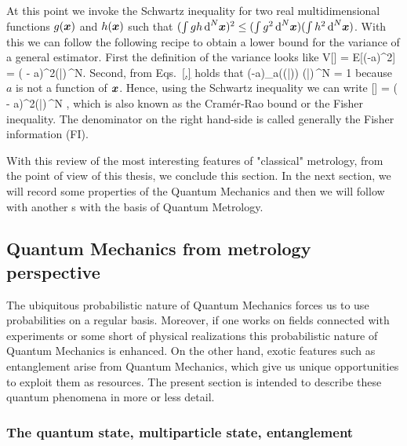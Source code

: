 At this point we invoke the Schwartz inequality for two real multidimensional functions $g(\boldsymbol{x})$ and $h(\boldsymbol{x})$ such that $(\int g h \,\text{d}^N\boldsymbol{x})^2\leq (\int g^2 \,\text{d}^N\boldsymbol{x}) (\int h^2 \,\text{d}^N\boldsymbol{x})$.
With this we can follow the following recipe to obtain a lower bound for the variance of a general estimator.
First the definition of the variance looks like
\be
  V[] = E[(-a)^2] = \int ( - a)^2\prob(|)\,^N.
\ee
Second, from Eqs.~\eqref{,} holds that
\be
  \int (-a)\partial_a\big(\ln  \prob(|)\big) \prob(|)\,^N = 1
\ee
because $a$ is not a function of $\boldsymbol{x}$.
Hence, using the Schwartz inequality we can write
\be
  [] = \int ( - a)^2\prob(|)\,^N \geq {},
\ee
which is also known as the Cram\'er-Rao bound or the Fisher inequality.
The denominator on the right hand-side is called generally the Fisher information (FI).

With this review of the most interesting features of "classical" metrology, from the point of view of this thesis, we conclude this section.
In the next section, we will record some properties of the Quantum Mechanics and then we will follow with another s with the basis of Quantum Metrology.

\subsection{Quantum Mechanics from metrology perspective}

The ubiquitous probabilistic nature of Quantum Mechanics forces us to use probabilities on a regular basis.
Moreover, if one works on fields connected with experiments or some short of physical realizations this probabilistic nature of Quantum Mechanics is enhanced.
On the other hand, exotic features such as entanglement arise from Quantum Mechanics, which give us unique opportunities to exploit them as resources.
The present section is intended to describe these quantum phenomena in more or less detail.

\subsubsection{The quantum state, multiparticle state, entanglement}

